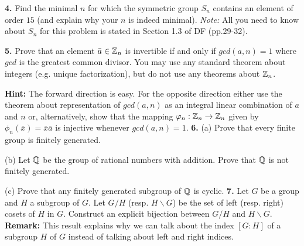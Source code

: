 \documentclass[12pt]{article}
\begin{document}
{\bf 4.} Find the minimal $n$ for which the symmetric group $S_n$ contains an element of order $15$
(and explain why your $n$ is indeed minimal). {\it Note: }All you need to know about $S_n$ for this
problem is stated in Section 1.3 of DF (pp.29-32).
\skv

{\bf 5.} Prove that an element $\bar a\in{\mathbb Z}_n$ is invertible if and only if $gcd(a,n)=1$
where $gcd$ is the greatest common divisor. You may use any standard theorem about integers
(e.g. unique factorization), but do not use any theorems about ${\mathbb Z}_n$.

{\bf Hint: } The forward direction is easy. For the opposite direction
either use the theorem about representation of $gcd(a,n)$ as an integral linear 
combination of $a$ and $n$ or, alternatively, show that the mapping ${\varphi}_n:{\mathbb Z}_n\to{\mathbb Z}_n$
given by  $\phi_n(\bar x)=\bar x\bar a$ is injective whenever $gcd(a,n)=1$.
\skv
{\bf 6.} (a) Prove that every finite group is finitely generated. 

(b) Let ${\mathbb Q}$ be the group of rational numbers with addition. Prove that ${\mathbb Q}$
is not finitely generated. 

(c) Prove that any finitely generated subgroup of ${\mathbb Q}$ is cyclic.
\skv
{\bf 7.} Let $G$ be a group and $H$ a subgroup of $G$. Let $G/H$ (resp. $H\backslash G$)
be the set of left (resp. right) cosets of $H$ in $G$. Construct an explicit
bijection between $G/H$ and $H\backslash G$. {\bf Remark:} This result explains
why we can talk about the index $[G:H]$ of a subgroup $H$ of $G$ instead
of talking about left and right indices.
\end{document}

